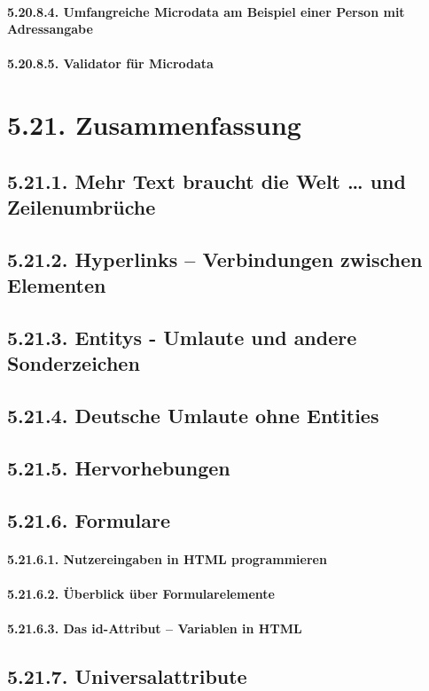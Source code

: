 \paragraph{5.20.8.4.	Umfangreiche Microdata am Beispiel einer Person mit Adressangabe}
\paragraph{5.20.8.5.	Validator für Microdata}
\section{5.21.	Zusammenfassung}
\subsection{5.21.1.	Mehr Text braucht die Welt … und Zeilenumbrüche}
\subsection{5.21.2.	Hyperlinks – Verbindungen zwischen Elementen}
\subsection{5.21.3.	Entitys - Umlaute und andere Sonderzeichen}
\subsection{5.21.4.	Deutsche Umlaute ohne Entities}
\subsection{5.21.5.	Hervorhebungen}
\subsection{5.21.6.	Formulare}
\paragraph{5.21.6.1.	Nutzereingaben in HTML programmieren}
\paragraph{5.21.6.2.	Überblick über Formularelemente}
\paragraph{5.21.6.3.	Das id-Attribut – Variablen in HTML}
\subsection{5.21.7.	Universalattribute}
